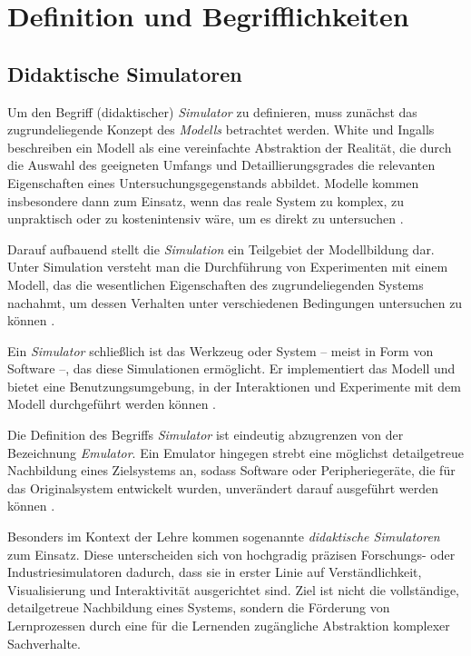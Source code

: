 \section{Definition und Begrifflichkeiten}

\subsection{Didaktische Simulatoren}
Um den Begriff (didaktischer) \textit{Simulator} zu definieren, muss zunächst das zugrundeliegende Konzept des \textit{Modells} betrachtet werden. White und Ingalls beschreiben ein Modell als eine vereinfachte Abstraktion der Realität, die durch die Auswahl des geeigneten Umfangs und Detaillierungsgrades die relevanten Eigenschaften eines Untersuchungsgegenstands abbildet. Modelle kommen insbesondere dann zum Einsatz, wenn das reale System zu komplex, zu unpraktisch oder zu kostenintensiv wäre, um es direkt zu untersuchen \parencites[S.~12]{white_introduction_2009}[S.~5]{banks_what_2008}.

Darauf aufbauend stellt die \textit{Simulation} ein Teilgebiet der Modellbildung dar. Unter Simulation versteht man die Durchführung von Experimenten mit einem Modell, das die wesentlichen Eigenschaften des zugrundeliegenden Systems nachahmt, um dessen Verhalten unter verschiedenen Bedingungen untersuchen zu können \parencites[S.~12]{white_introduction_2009}[S.~6]{banks_what_2008}.

Ein \textit{Simulator} schließlich ist das Werkzeug oder System -- meist in Form von Software --, das diese Simulationen ermöglicht. Er implementiert das Modell und bietet eine Benutzungsumgebung, in der Interaktionen und Experimente mit dem Modell durchgeführt werden können \parencite[S.~304f]{duran_what_2020}.

Die Definition des Begriffs \textit{Simulator} ist eindeutig abzugrenzen von der Bezeichnung \textit{Emulator}. Ein Emulator hingegen strebt eine möglichst detailgetreue Nachbildung eines Zielsystems an, sodass Software oder Peripheriegeräte, die für das Originalsystem entwickelt wurden, unverändert darauf ausgeführt werden können \parencite[S.~1683]{mcgregor_relationship_2002}.

Besonders im Kontext der Lehre kommen sogenannte \textit{didaktische Simulatoren} zum Einsatz. Diese unterscheiden sich von hochgradig präzisen Forschungs- oder Industriesimulatoren dadurch, dass sie in erster Linie auf Verständlichkeit, Visualisierung und Interaktivität ausgerichtet sind. Ziel ist nicht die vollständige, detailgetreue Nachbildung eines Systems, sondern die Förderung von Lernprozessen durch eine für die Lernenden zugängliche Abstraktion komplexer Sachverhalte.\parencites[S.~256]{muller_entwicklung_2020}[S.~1]{nystrom_teaching_2024}

